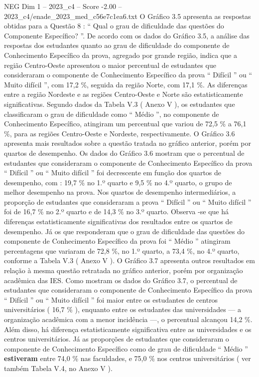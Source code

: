 \begin{textsample}{NEG Dim 1 – 2023\_c4 – Score -2.00 – 2023\_c4/enade\_2023\_med\_c56e7c1ea6.txt}
O Gráfico 3.5 apresenta as respostas obtidas para a Questão 8 : “ Qual o grau de dificuldade das questões do Componente Específico? ”.
De acordo com os dados do Gráfico 3.5, a análise das respostas dos estudantes quanto ao grau de dificuldade do componente de Conhecimento Específico da prova, agregado por grande região, indica que a região Centro-Oeste apresentou o maior percentual de estudantes que consideraram o componente de Conhecimento Específico da prova “ Difícil ” ou “ Muito difícil ”, com 17,2 \%, seguida da região Norte, com 17,1 \%.
As diferenças entre a região Nordeste e as regiões Centro-Oeste e Norte são estatisticamente significativas.
Segundo dados da Tabela V.3 ( Anexo V ), os estudantes que classificaram o grau de dificuldade como “ Médio ”, no componente de Conhecimento Específico, atingiram um percentual que variou de 72,5 \% a 76,1 \%, para as regiões Centro-Oeste e Nordeste, respectivamente.
O Gráfico 3.6 apresenta mais resultados sobre a questão tratada no gráfico anterior, porém por quartos de desempenho.
Os dados do Gráfico 3.6 mostram que o percentual de estudantes que consideraram o componente de Conhecimento Específico da prova “ Difícil ” ou “ Muito difícil ” foi decrescente em função dos quartos de desempenho, com : 19,7 \% no 1.º quarto e 9,5 \% no 4.º quarto, o grupo de melhor desempenho na prova.
Nos quartos de desempenho intermediários, a proporção de estudantes que consideraram a prova “ Difícil ” ou “ Muito difícil ” foi de 16,7 \% no 2.º quarto e de 14,3 \% no 3.º quarto.
Observa -se que há diferenças estatisticamente significativas dos resultados entre os quartos de desempenho.
Já os que responderam que o grau de dificuldade das questões do componente de Conhecimento Específico da prova foi “ Médio ” atingiram percentagens que variaram de 72,8 \%, no 1.º quarto, a 73,4 \%, no 4.º quarto, conforme a Tabela V.3 ( Anexo V ).
O Gráfico 3.7 apresenta outros resultados em relação à mesma questão retratada no gráfico anterior, porém por organização acadêmica das IES.
Como mostram os dados do Gráfico 3.7, o percentual de estudantes que consideraram o componente de Conhecimento Específico da prova “ Difícil ” ou “ Muito difícil ” foi maior entre os estudantes de centros universitários ( 16,7 \% ), enquanto entre os estudantes das universidades — a organização acadêmica com a menor incidência —, o percentual alcançou 14,2 \%.
Além disso, há diferença estatisticamente significativa entre as universidades e os centros universitários.
Já as proporções de estudantes que consideraram o componente de Conhecimento Específico como de grau de dificuldade “ Médio ” \textbf{estiveram} entre 74,0 \% nas faculdades, e 75,0 \% nos centros universitários ( ver também Tabela V.4, no Anexo V ).

\end{textsample}
